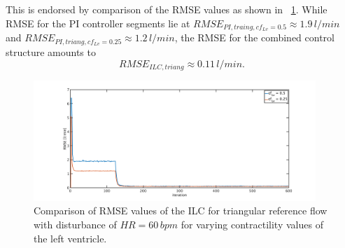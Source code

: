 This is endorsed by comparison of the RMSE values as shown in \figurename~\ref{fig:RMSE_dist_triang_var_cf}. While RMSE for the PI controller segments lie at $RMSE_{PI,traing,cf_{Lv}=0.5}\approx 1.9\, l/min$ and $RMSE_{PI,triang,cf_{Lv}=0.25}\approx 1.2\, l/min$, the RMSE for the combined control structure amounts to
\begin{equation}
  RMSE_{ILC,triang}\approx 0.11\, l/min.
\end{equation}
\begin{figure}[ht!]
  \centering
  \includegraphics[width=0.95\textwidth]{images/chapt_5/ILC/RMSE_dist_triang_var_cf.pdf}
  \caption[RMSE Comparison of ILC at triangular reference flow for varying left ventricular contractilities]{Comparison of RMSE values of the ILC for triangular reference flow with disturbance of $HR=60\,bpm$ for varying contractility values of the left ventricle.}
  \label{fig:RMSE_dist_triang_var_cf}
\end{figure}

